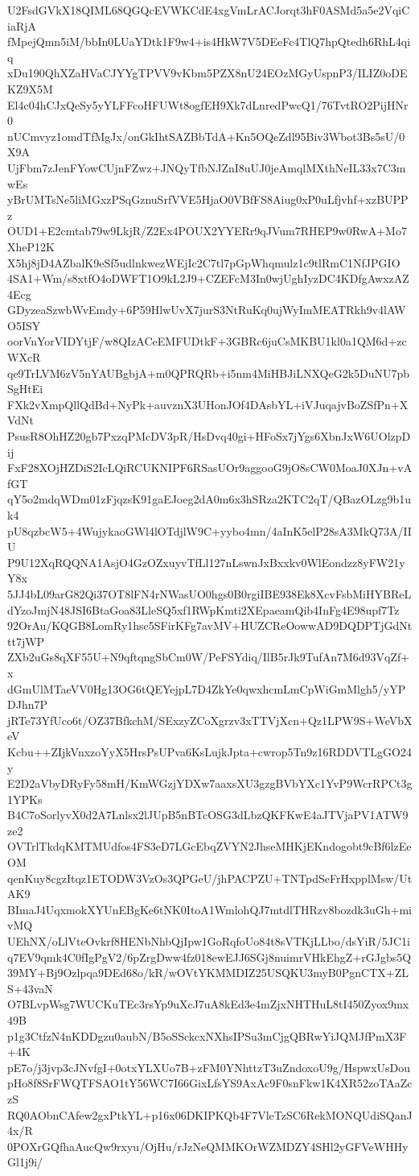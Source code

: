 U2FsdGVkX18QIML68QGQcEVWKCdE4xgVmLrACJorqt3hF0ASMd5a5e2VqiCiaRjA
fMpejQmn5iM/bbIn0LUaYDtk1F9w4+is4HkW7V5DEeFc4TlQ7hpQtedh6RhL4qiq
xDu190QhXZaHVaCJYYgTPVV9vKbm5PZX8nU24EOzMGyUspnP3/ILIZ0oDEKZ9X5M
El4c04hCJxQeSy5yYLFFcoHFUWt8ogfEH9Xk7dLnredPwcQ1/76TvtRO2PijHNr0
nUCmvyz1omdTfMgJx/onGkIhtSAZBbTdA+Kn5OQeZdl95Biv3Wbot3Bs5sU/0X9A
UjFbm7zJenFYowCUjnFZwz+JNQyTfbNJZnI8uUJ0jeAmqlMXthNeIL33x7C3mwEs
yBrUMTsNe5liMGxzPSqGznuSrfVVE5HjaO0VBfFS8Aiug0xP0uLfjvhf+xzBUPPz
OUD1+E2cmtab79w9LkjR/Z2Ex4POUX2YYERr9qJVum7RHEP9w0RwA+Mo7XheP12K
X5hj8jD4AZbalK9eSf5udlnkwezWEjIc2C7tl7pGpWhqmulz1c9tlRmC1NfJPGIO
4SA1+Wm/s8xtfO4oDWFT1O9kL2J9+CZEFcM3In0wjUghIyzDC4KDfgAwxzAZ4Ecg
GDyzeaSzwbWvEmdy+6P59HlwUvX7jurS3NtRuKq0ujWyImMEATRkh9v4lAWO5ISY
oorVnYorVIDYtjF/w8QIzACeEMFUDtkF+3GBRc6juCsMKBU1kl0a1QM6d+zcWXcR
qe9TrLVM6zV5nYAUBgbjA+m0QPRQRb+i5nm4MiHBJiLNXQeG2k5DuNU7pbSgHtEi
FXk2vXmpQllQdBd+NyPk+auvznX3UHonJOf4DAsbYL+iVJuqajvBoZSfPn+XVdNt
PsusR8OhHZ20gb7PxzqPMcDV3pR/HsDvq40gi+HFoSx7jYgs6XbnJxW6UOlzpDij
FxF28XOjHZDiS2IcLQiRCUKNIPF6RSasUOr9aggooG9jO8sCW0MoaJ0XJn+vAfGT
qY5o2mdqWDm01zFjqzsK91gaEJoeg2dA0m6x3hSRza2KTC2qT/QBazOLzg9b1uk4
pU8qzbcW5+4WujykaoGWl4lOTdjlW9C+yybo4mn/4aInK5elP28sA3MkQ73A/IIU
P9U12XqRQQNA1AsjO4GzOZxuyvTfLl127nLswnJxBxxkv0WlEondzz8yFW21yY8x
5JJ4bL09arG82Qi37OT8lFN4rNWasUO0hgs0B0rgiIBE938Ek8XcvFsbMiHYBReL
dYzoJmjN48JSI6BtaGoa83LleSQ5xf1RWpKmti2XEpaeamQib4InFg4E98upf7Tz
92OrAu/KQGB8LomRy1hsc5SFirKFg7avMV+HUZCReOowwAD9DQDPTjGdNttt7jWP
ZXb2uGs8qXF55U+N9qftqngSbCm0W/PeFSYdiq/IlB5rJk9TufAn7M6d93VqZf+x
dGmUlMTaeVV0Hg13OG6tQEYejpL7D4ZkYe0qwxhcmLmCpWiGmMlgh5/yYPDJhn7P
jRTe73YfUco6t/OZ37BfkchM/SExzyZCoXgrzv3xTTVjXcn+Qz1LPW9S+WeVbXeV
Kcbu++ZIjkVnxzoYyX5HrsPsUPva6KsLujkJpta+cwrop5Tn9z16RDDVTLgGO24y
E2D2aVbyDRyFy58mH/KmWGzjYDXw7aaxsXU3gzgBVbYXc1YvP9WcrRPCt3g1YPKs
B4C7oSorlyvX0d2A7Lnlsx2lJUpB5nBTcOSG3dLbzQKFKwE4aJTVjaPV1ATW9ze2
OVTrlTkdqKMTMUdfos4FS3eD7LGcEbqZVYN2JhseMHKjEKndogobt9cBf6lzEeOM
qenKuy8cgzItqz1ETODW3VzOs3QPGeU/jhPACPZU+TNTpdSeFrHxpplMsw/UtAK9
BImaJ4UqxmokXYUnEBgKe6tNK0ItoA1WmlohQJ7mtdlTHRzv8bozdk3uGh+mivMQ
UEhNX/oLlVteOvkrf8HENbNhbQjIpw1GoRqfoUo84t8sVTKjLLbo/dsYiR/5JC1i
q7EV9qmk4C0fIgPgV2/6pZrgDww4fz018ewEJJ6SGj8nuimrVHkEhgZ+rGJgbs5Q
39MY+Bj9Ozlpqa9DEd68o/kR/wOVtYKMMDIZ25USQKU3myB0PgnCTX+ZLS+43vaN
O7BLvpWsg7WUCKuTEc3rsYp9uXcJ7uA8kEd3e4mZjxNHTHuL8tI450Zyox9mx49B
p1g3CtfzN4nKDDgzu0aubN/B5oSSckcxNXhsIPSu3mCjgQBRwYiJQMJfPmX3F+4K
pE7o/j3jvp3cJNvfgI+0otxYLXUo7B+zFM0YNhttzT3uZndoxoU9g/HspwxUsDou
pHo8f8SrFWQTFSAO1tY56WC7I66GixLfsYS9AxAc9F0snFkw1K4XR52zoTAaZczS
RQ0AObnCAfew2gxPtkYL+p16x06DKIPKQb4F7VleTzSC6RekMONQUdiSQanJ4x/R
0POXrGQfhaAucQw9rxyu/OjHu/rJzNeQMMKOrWZMDZY4SHl2yGFVeWHHyGl1j9i/
